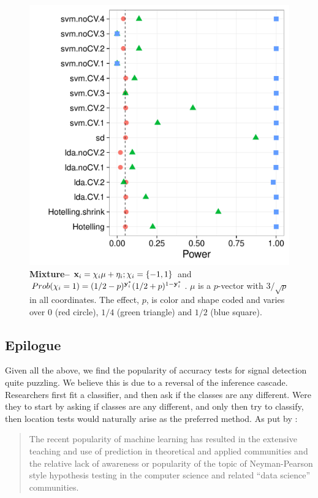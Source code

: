 \documentclass[12pt,a4paper]{article}
\begin{document}
\begin{figure}[ht]
\centering
	  \includegraphics[width=0.7\linewidth]{"art/2016-08-08 07:33:05"}
	  \caption{\textbf{Mixture--} $\mathbf{x}_i = \chi_i \mu + \eta_i; \chi_i = \{ -1,1 \}$ and $Prob( \chi_i=1 )=(1/2-p)^{\mathbf{y}^*_i}  (1/2+p)^{1-\mathbf{y}^*_i}$. $\mu$ is a $p$-vector with $3/\sqrt{p}$ in all coordinates.
	  The effect, $p$, is color and shape coded and varies over $0$ (red circle), $1/4$ (green triangle) and $1/2$ (blue square). }
	\label{fig:golland}
\end{figure}










\subsection{Epilogue}
Given all the above, we find the popularity of accuracy tests for signal detection quite puzzling. 
We believe this is due to a reversal of the inference cascade. 
Researchers first fit a classifier, and then ask if the classes are any different.
Were they to start by asking if classes are any different, and only then try to classify, then location tests would naturally arise as the preferred method. 
As put by \cite{ramdas_classification_2016}:
\begin{quote}
The recent popularity of machine learning has resulted in the extensive teaching and use
of prediction in theoretical and applied communities and the relative lack of awareness or
popularity of the topic of Neyman-Pearson style hypothesis testing in the computer science
and related ``data science'' communities.
\end{quote}
\end{document}
